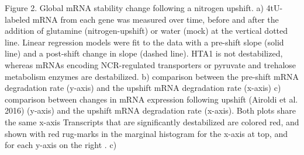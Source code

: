 Figure 2. Global mRNA stability change following a nitrogen upshift.
a) 4tU-labeled mRNA from each gene was measured over time, before and
after the addition of glutamine (nitrogen-upshift) or water (mock) at
the vertical dotted line. Linear regression models were fit to the
data with a pre-shift slope (solid line) and a post-shift change in
slope (dashed line). HTA1 is not destabilized, whereas mRNAs encoding
NCR-regulated transporters or pyruvate and trehalose metabolism
enzymes are destabilized. b) comparison between the pre-shift mRNA
degradation rate (y-axis) and the upshift mRNA degradation rate
(x-axis)  c)  comparison between changes in mRNA expression following
upshift (Airoldi et al. 2016) (y-axis) and the upshift mRNA
degradation rate (x-axis). Both plots share the same x-axis
Transcripts that are significantly destabilized are colored red, and
shown with red rug-marks in the marginal histogram for the x-axis at
top, and for each y-axis on the right . c)


